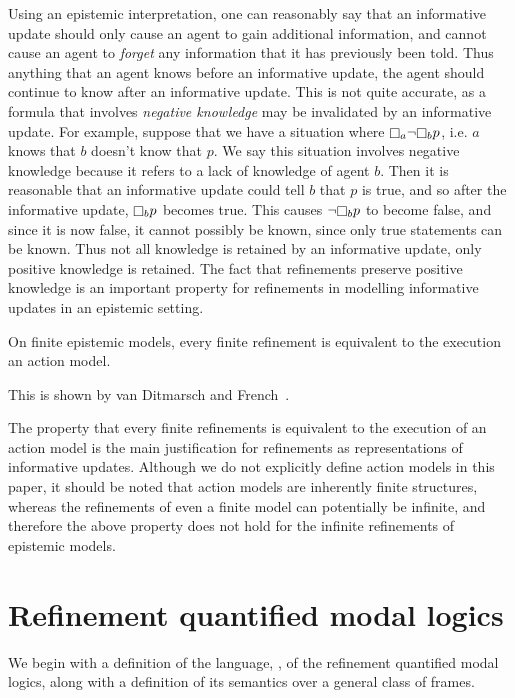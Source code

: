 Using an epistemic interpretation, one can reasonably say that an informative
update should only cause an agent to gain additional information, and cannot
cause an agent to {\em forget} any information that it has previously been told.
Thus anything that an agent knows before an informative update, the agent should
continue to know after an informative update. This is not quite accurate, as a
formula that involves {\em negative knowledge} may be invalidated by an
informative update. For example, suppose that we have a situation where
$\knows_a \neg \knows_b p$, i.e. $a$ knows that $b$ doesn't know that $p$. We
say this situation involves negative knowledge because it refers to a lack of
knowledge of agent $b$. Then it is reasonable that an informative update could
tell $b$ that $p$ is true, and so after the informative update, $\knows_b p$
becomes true.  This causes $\neg \knows_b p$ to become false, and since it is
now false, it cannot possibly be known, since only true statements can be
known. Thus not all knowledge is retained by an informative update, only
positive knowledge is retained. The fact that refinements preserve positive
knowledge is an important property for refinements in modelling informative
updates in an epistemic setting.

\begin{proposition}
On finite epistemic models, every finite refinement is equivalent to the
execution an action model.
\end{proposition}

This is shown by van Ditmarsch and French~\cite{french2009simulation}.

The property that every finite refinements is equivalent to the execution of an
action model is the main justification for refinements as representations of
informative updates. Although we do not explicitly define action models in this
paper, it should be noted that action models are inherently finite structures,
whereas the refinements of even a finite model can potentially be infinite, and
therefore the above property does not hold for the infinite refinements of
epistemic models.

\section{Refinement quantified modal logics}

We begin with a definition of the language, \langF{}, of the refinement
quantified modal logics, along with a definition of its semantics over a general
class of frames.

